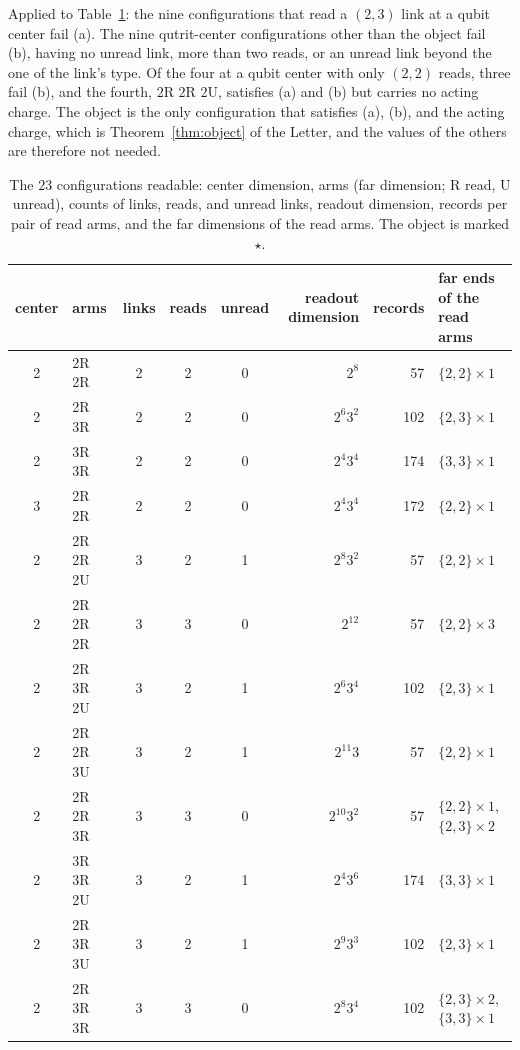 Applied to Table~\ref{tab:s-configs}: the nine configurations that read a $(2,3)$ link at a qubit center fail (a). The nine qutrit-center configurations other than the object fail (b), having no unread link, more than two reads, or an unread link beyond the one of the link's type. Of the four at a qubit center with only $(2,2)$ reads, three fail (b), and the fourth, $2$R $2$R $2$U, satisfies (a) and (b) but carries no acting charge. The object is the only configuration that satisfies (a), (b), and the acting charge, which is Theorem~\ref{thm:object} of the Letter, and the values of the others are therefore not needed.

\begin{table}[h]
\caption{The $23$ configurations readable: center dimension, arms (far dimension; R read, U unread), counts of links, reads, and unread links, readout dimension, records per pair of read arms, and the far dimensions of the read arms. The object is marked $\star$.}
\label{tab:s-configs}
\begin{ruledtabular}
\begin{tabular}{clcccrrl}
center & arms & links & reads & unread & readout dimension & records & far ends of the read arms \\ \hline
2 & 2R 2R & 2 & 2 & 0 & $2^{8}$ & 57 & $\{2,2\}\times 1$ \\
2 & 2R 3R & 2 & 2 & 0 & $2^{6}3^{2}$ & 102 & $\{2,3\}\times 1$ \\
2 & 3R 3R & 2 & 2 & 0 & $2^{4}3^{4}$ & 174 & $\{3,3\}\times 1$ \\
3 & 2R 2R & 2 & 2 & 0 & $2^{4}3^{4}$ & 172 & $\{2,2\}\times 1$ \\
2 & 2R 2R 2U & 3 & 2 & 1 & $2^{8}3^{2}$ & 57 & $\{2,2\}\times 1$ \\
2 & 2R 2R 2R & 3 & 3 & 0 & $2^{12}$ & 57 & $\{2,2\}\times 3$ \\
2 & 2R 3R 2U & 3 & 2 & 1 & $2^{6}3^{4}$ & 102 & $\{2,3\}\times 1$ \\
2 & 2R 2R 3U & 3 & 2 & 1 & $2^{11}3$ & 57 & $\{2,2\}\times 1$ \\
2 & 2R 2R 3R & 3 & 3 & 0 & $2^{10}3^{2}$ & 57 & $\{2,2\}\times 1$, $\{2,3\}\times 2$ \\
2 & 3R 3R 2U & 3 & 2 & 1 & $2^{4}3^{6}$ & 174 & $\{3,3\}\times 1$ \\
2 & 2R 3R 3U & 3 & 2 & 1 & $2^{9}3^{3}$ & 102 & $\{2,3\}\times 1$ \\
2 & 2R 3R 3R & 3 & 3 & 0 & $2^{8}3^{4}$ & 102 & $\{2,3\}\times 2$, $\{3,3\}\times 1$ \\

\end{tabular}
\end{ruledtabular}
\end{table}
